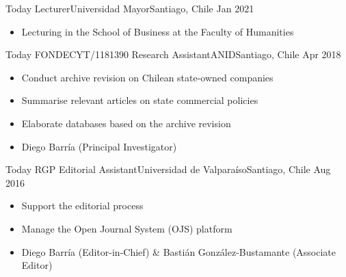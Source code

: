 






\begin{experiences}
  \emptySeparator 
  \experience 
    {Today} {Lecturer}{Universidad Mayor}{Santiago, Chile} {Jan 2021}
    {\begin{itemize}
    \item Lecturing in the School of Business at the Faculty of Humanities
    \end{itemize}}
    {}
\end{experiences}
\vspace{-2mm}

\begin{experiences}
  \emptySeparator 
  \experience 
    {Today} {FONDECYT/1181390 Research Assistant}{ANID}{Santiago, Chile} {Apr 2018}
    {\begin{itemize}
    \item Conduct archive revision on Chilean state-owned companies
    \item Summarise relevant articles on state commercial policies
    \item Elaborate databases based on the archive revision
    \item Diego Barría {\small (Principal Investigator)}
    \end{itemize}}
    {}
\end{experiences}
\vspace{-2mm}

\begin{experiences}
  \experience
    {Today} {RGP Editorial Assistant}{Universidad de Valparaíso}{Santiago, Chile} {Aug 2016}
    {\begin{itemize}
    \item Support the editorial process
    \item Manage the Open Journal System (OJS) platform 
    \item Diego Barría {\small (Editor-in-Chief)} \& Bastián González-Bustamante {\small (Associate Editor)}
    \end{itemize}}
    {}
\end{experiences}
\vspace{-2mm}

